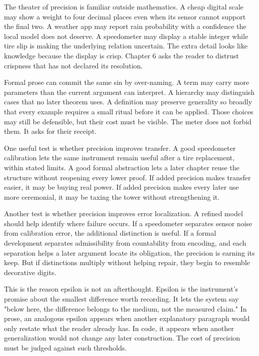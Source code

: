 The theater of precision is familiar outside mathematics. A cheap digital
scale may show a weight to four decimal places even when its sensor cannot
support the final two. A weather app may report rain probability with a
confidence the local model does not deserve. A speedometer may display a stable
integer while tire slip is making the underlying relation uncertain. The extra
detail looks like knowledge because the display is crisp. Chapter 6 asks the
reader to distrust crispness that has not declared its resolution.

Formal prose can commit the same sin by over-naming. A term may carry more
parameters than the current argument can interpret. A hierarchy may distinguish
cases that no later theorem uses. A definition may preserve generality so
broadly that every example requires a small ritual before it can be applied.
Those choices may still be defensible, but their cost must be visible. The
meter does not forbid them. It asks for their receipt.

One useful test is whether precision improves transfer. A good speedometer
calibration lets the same instrument remain useful after a tire replacement,
within stated limits. A good formal abstraction lets a later chapter reuse the
structure without reopening every lower proof. If added precision makes
transfer easier, it may be buying real power. If added precision makes every
later use more ceremonial, it may be taxing the tower without strengthening it.

Another test is whether precision improves error localization. A refined model
should help identify where failure occurs. If a speedometer separates sensor
noise from calibration error, the additional distinction is useful. If a formal
development separates admissibility from countability from encoding, and each
separation helps a later argument locate its obligation, the precision is
earning its keep. But if distinctions multiply without helping repair, they
begin to resemble decorative digits.

This is the reason epsilon is not an afterthought. Epsilon is the instrument's
promise about the smallest difference worth recording. It lets the system say
"below here, the difference belongs to the medium, not the measured claim." In
prose, an analogous epsilon appears when another explanatory paragraph would
only restate what the reader already has. In code, it appears when another
generalization would not change any later construction. The cost of precision
must be judged against such thresholds.


